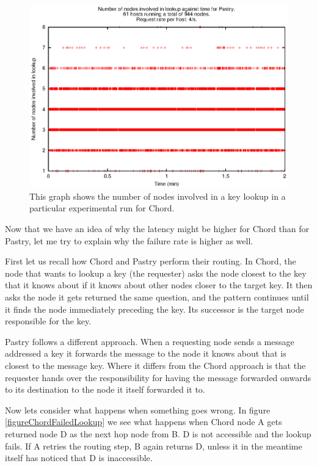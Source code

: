 \begin{figure}[!htbp]
  \begin{center}
    \includegraphics[width=0.9\linewidth]{illustrations/nodes_against_time_pastry.eps}
    \caption{This graph shows the number of nodes involved in a key lookup in a particular experimental run for Chord.}
    \label{figPastryNumNodes}
  \end{center}
\end{figure}

\mbox{}
Now that we have an idea of why the latency might be higher for Chord than for Pastry, let me try to explain why the failure rate is higher as well.

First let us recall how Chord and Pastry perform their routing.
In Chord, the node that wants to lookup a key (the requester) asks the node closest to the key that it knows about if it knows about other nodes closer to the target key. It then asks the node it gets returned the same question, and the pattern continues until it finds the node immediately preceding the key. Its successor is the target node responsible for the key.

Pastry follows a different approach. When a requesting node sends a message addressed a key it forwards the message to the node it knows about that is closest to the message key. Where it differs from the Chord approach is that the requester hands over the responsibility for having the message forwarded onwards to its destination to the node it itself forwarded it to.

Now lets consider what happens when something goes wrong.
In figure \ref{figureChordFailedLookup} we see what happens when Chord node A gets returned node D as the next hop node from B. D is not accessible and the lookup fails. If A retries the routing step, B again returns D, unless it in the meantime itself has noticed that D is inaccessible.


